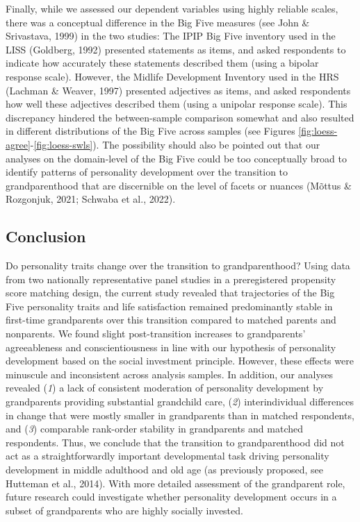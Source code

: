 \documentclass[
  english,
  man,floatsintext]{apa7}
\begin{document}
Finally, while we assessed our dependent variables using highly reliable scales, there was a conceptual difference in the Big Five measures (see John \& Srivastava, 1999) in the two studies: The IPIP Big Five inventory used in the LISS (Goldberg, 1992) presented statements as items, and asked respondents to indicate how accurately these statements described them (using a bipolar response scale). However, the Midlife Development Inventory used in the HRS (Lachman \& Weaver, 1997) presented adjectives as items, and asked respondents how well these adjectives described them (using a unipolar response scale). This discrepancy hindered the between-sample comparison somewhat and also resulted in different distributions of the Big Five across samples (see Figures \ref{fig:loess-agree}-\ref{fig:loess-swls}). The possibility should also be pointed out that our analyses on the domain-level of the Big Five could be too conceptually broad to identify patterns of personality development over the transition to grandparenthood that are discernible on the level of facets or nuances (Mõttus \& Rozgonjuk, 2021; Schwaba et al., 2022).

\hypertarget{conclusion}{%
\subsection{Conclusion}\label{conclusion}}

Do personality traits change over the transition to grandparenthood? Using data from two nationally representative panel studies in a preregistered propensity score matching design, the current study revealed that trajectories of the Big Five personality traits and life satisfaction remained predominantly stable in first-time grandparents over this transition compared to matched parents and nonparents. We found slight post-transition increases to grandparents' agreeableness and conscientiousness in line with our hypothesis of personality development based on the social investment principle. However, these effects were minuscule and inconsistent across analysis samples. In addition, our analyses revealed (\emph{1}) a lack of consistent moderation of personality development by grandparents providing substantial grandchild care, (\emph{2}) interindividual differences in change that were mostly smaller in grandparents than in matched respondents, and (\emph{3}) comparable rank-order stability in grandparents and matched respondents. Thus, we conclude that the transition to grandparenthood did not act as a straightforwardly important developmental task driving personality development in middle adulthood and old age (as previously proposed, see Hutteman et al., 2014). With more detailed assessment of the grandparent role, future research could investigate whether personality development occurs in a subset of grandparents who are highly socially invested.
\end{document}
